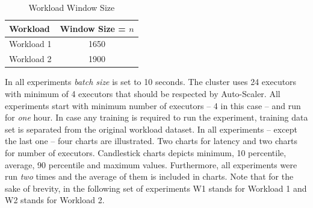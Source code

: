 \begin{table}[h]
    \begin{tabular}{lc}
        \toprule
        \textbf{Workload} & \textbf{Window Size = $n$ }\\
        \midrule
        Workload 1 & 1650\\
        Workload 2 & 1900\\
        \bottomrule
    \end{tabular}
    \centering
    \caption{Workload Window Size}
    \label{eval:tab:history}
\end{table}

In all experiments \emph{batch size} is set to 10 seconds. The cluster uses 24 executors with minimum of 4 executors that should be respected by Auto-Scaler. All experiments start with minimum number of executors -- 4 in this case -- and run for \emph{one} hour. In case any training is required to run the experiment, training data set is separated from the original workload dataset. In all experiments -- except the last one -- four charts are illustrated. Two charts for latency and two charts for number of executors. Candlestick charts depicts minimum, 10 percentile, average, 90 percentile and maximum values. Furthermore, all experiments were run \emph{two} times and the average of them is included in charts. Note that for the sake of brevity, in the following set of experiments W1 stands for Workload 1 and W2 stands for Workload 2.
\clearpage

